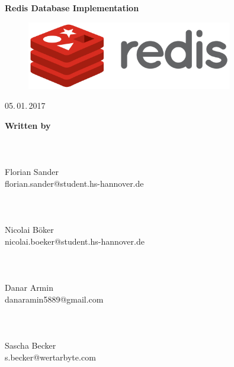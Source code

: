 \documentclass[11pt,DIV12,BCOR0mm,oneside,headings=normal,%
  numbers=noenddot,headsepline,headinclude]{scrreprt}
\begin{document}

\thispagestyle{empty}
{}

\begin{center}
  \vspace*{4\baselineskip}
  {\sffamily\bfseries\LARGE
    Redis Database Implementation\par}
  
  \vspace*{4\baselineskip}
  {\Large }

  \vfill
  {\Large }
  \begin{figure}[htb!]
  	\centerline{\includegraphics[width=0.8\textwidth]{resources/Redis_Logo.png}}
  \end{figure}
  
  
  \vspace*{4\baselineskip}
  {\Large \par}
  
  \vspace*{4\baselineskip}
  {\Large 05.\,01.\,2017}
  
  \vspace*{4\baselineskip}
\end{center}


{\huge\textbf{Written by}} \\
\\
\\
\textbf{} \\
Florian Sander \\
florian.sander@student.hs-hannover.de \\
\\
\\
\textbf{} \\
Nicolai Böker \\
nicolai.boeker@student.hs-hannover.de \\
\\
\\
\textbf{} \\
Danar Armin \\
danaramin5889@gmail.com \\
\\
\\
\textbf{} \\
Sascha Becker \\
s.becker@wertarbyte.com \\
\\
\\
\\
\\
\end{document}
